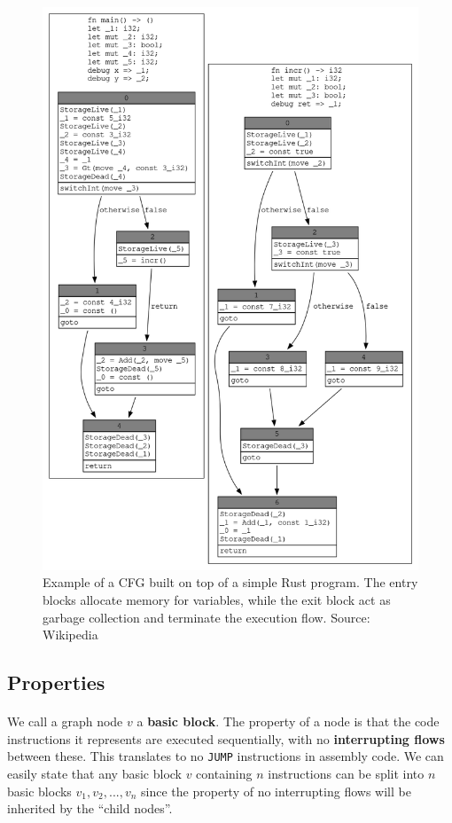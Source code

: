 \begin{figure}
    \centering
    \includegraphics[width=15cm]{images/cfg_rust_example.png}
    \caption{Example of a CFG built on top of a simple Rust program. The entry blocks allocate memory for variables, while the exit block act as garbage collection and terminate the execution flow. Source: Wikipedia}
    \label{fig:cfg-rust-example}
\end{figure}

\subsection{Properties}
\paragraph*{}
We call a graph node $v$ a \textbf{basic block}. The property of a node is that the code instructions it represents are executed sequentially, with no \textbf{interrupting flows} between these. This translates to no \lstinline[columns=fixed]{JUMP} instructions in assembly code. We can easily state that any basic block $v$ containing $n$ instructions can be split into $n$ basic blocks $v_1, v_2, ..., v_n$ since the property of no interrupting flows will be inherited by the ``child nodes''.

